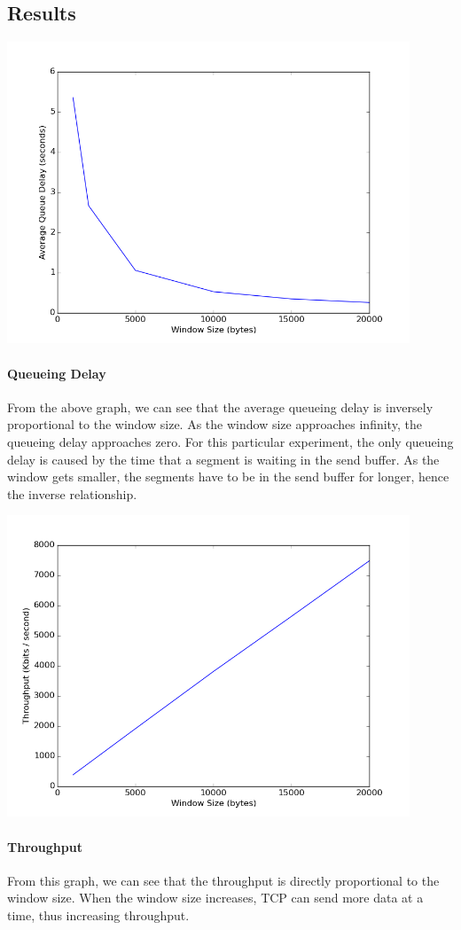\documentclass[11pt]{article}
\begin{document}
\subsection{Results}

\includegraphics[width=12cm]{../graphs/queue_delay_graph.png}

\paragraph{Queueing Delay}
From the above graph, we can see that the average queueing delay is inversely proportional to the window size. As the window size approaches infinity, the queueing delay approaches zero. For this particular experiment, the only queueing delay is caused by the time that a segment is waiting in the send buffer. As the window gets smaller, the segments have to be in the send buffer for longer, hence the inverse relationship.

\includegraphics[width=12cm]{../graphs/throughput_graph.png}
\paragraph{Throughput}
From this graph, we can see that the throughput is directly proportional to the window size. When the window size increases, TCP can send more data at a time, thus increasing throughput.
\end{document}
